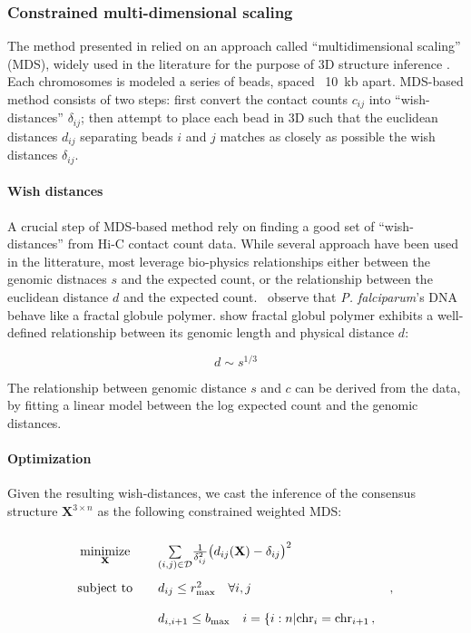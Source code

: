 \documentclass[letterpaper,12pt]{article}
\begin{document}
\subsubsection{Constrained multi-dimensional scaling}

The method presented in \citet{ay:three-dimensional} relied on an
approach called ``multidimensional scaling'' (MDS), widely used in the
literature for the purpose of 3D structure inference
\citep{duan:three-dimensional, varoquaux:statistical, bau:, tanizawa:}. Each chromosomes is
modeled a series of beads, spaced ~10~kb apart. MDS-based method consists of
two steps: first convert the
contact counts $c_{ij}$ into ``wish-distances'' $\delta_{ij}$; then attempt
to place each bead in 3D such that the euclidean distances $d_{ij}$ separating
beads $i$ and $j$ matches as closely as possible the wish distances
$\delta_{ij}$.

\paragraph{Wish distances}

A crucial step of MDS-based method rely on finding a good set of
``wish-distances'' from Hi-C contact count data. While several approach have
been used in the litterature, most leverage bio-physics relationships either
between the genomic distnaces $s$ and the expected count, or the relationship
between the euclidean distance $d$ and the expected
count. \citet{ay:three-dimensional} observe that {\em P. falciparum}'s DNA
behave like a fractal globule polymer. \citet{grosberg:fractal} show fractal
globul polymer exhibits a well-defined relationship between its genomic length
and physical distance $d$:

$$d\sim s^{1/3}$$

The relationship between genomic distance $s$ and $c$ can be derived from the
data, by fitting a linear model between the log expected count and the genomic
distances.

\paragraph{Optimization}

Given the resulting wish-distances, we cast the inference of the consensus
structure $\mathbf{X}^{3 \times n}$ as the following constrained weighted MDS:


\begin{equation}\label{eq:mds1} 
\renewcommand{\arraystretch}{2} 
\begin{array}{ccll} 
\underset{\mathbf{X}}{\text{minimize}} & & 
\underset{(i,j) \in \mathcal{D}}{\sum} \frac{1}{\delta^2_{ij}}
\big(d_{ij}(\mathbf{X}) - \delta_{ij}\big)^2 & \\
\text{subject to} & & d_{ij} \leq r^2_\text{max} \quad \forall i, j &\,,\\
& & d_{i, i+1} \leq b_\text{max} \quad i = \{i:n|\text{chr}_i = \text{chr}_{i+1}\,,&\\ 
\end{array} 
\end{equation}
\end{document}
